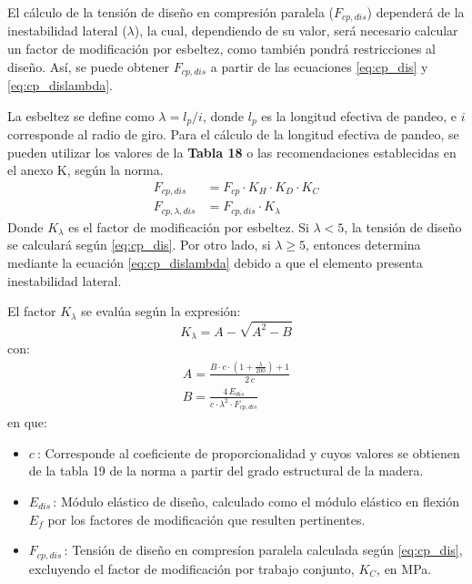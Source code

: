 El cálculo de la tensión de diseño en compresión paralela ($F_{cp,dis}$) dependerá de la inestabilidad lateral ($\lambda$), la cual, dependiendo de su valor, será necesario calcular un factor de modificación por esbeltez, como también pondrá restricciones al diseño. Así, se puede obtener $F_{cp,dis}$ a partir de las ecuaciones \ref{eq:cp_dis} y \ref{eq:cp_dislambda}. 

La esbeltez se define como $\lambda = l_p/i$, donde $l_p$ es la longitud efectiva de pandeo, e $i$ corresponde al radio de giro. Para el cálculo de la longitud efectiva de pandeo, se pueden utilizar los valores de la \textbf{Tabla 18} o las recomendaciones establecidas en el anexo K, según la norma.
\begin{subequations}
\begin{align}
	F_{cp,dis} &= F_{cp} \cdot K_H \cdot K_D \cdot K_C \label{eq:cp_dis}\\
	F_{cp,\lambda,dis} &= F_{cp,dis} \cdot K_{\lambda} \label{eq:cp_dislambda}
\end{align}
\end{subequations}
Donde $K_{\lambda}$ es el factor de modificación por esbeltez. Si $\lambda < 5$, la tensión de diseño se calculará según \ref{eq:cp_dis}. Por otro lado, si $\lambda \geq 5$, entonces determina mediante la ecuación \ref{eq:cp_dislambda} debido a que el elemento presenta inestabilidad lateral.

El factor $K_{\lambda}$ se evalúa según la expresión:
\begin{equation}\label{eq:k_lambda}
	K_{\lambda} = A - \sqrt{A^2 - B}
\end{equation}
con:
\begin{gather}
	A = \frac{B\cdot c\cdot (1 + \frac{\lambda}{200}) + 1}{2\,c} \\
	B = \frac{4\, E_{dis}}{c\cdot \lambda^2\cdot F_{cp,dis}}
\end{gather}
en que:
\begin{itemize}
	\item $c\:$: Corresponde al coeficiente de proporcionalidad y cuyos valores se obtienen de la tabla 19 de la norma a partir del grado estructural de la madera.
	\item $E_{dis}\,$: Módulo elástico de diseño, calculado como el módulo elástico en flexión $E_f$ por los factores de modificación que resulten pertinentes.  
	\item $F_{cp,dis}\,$: Tensión de diseño en compresíon paralela calculada según \ref{eq:cp_dis}, excluyendo el factor de modificación por trabajo conjunto, $K_C$, en MPa.
\end{itemize}

